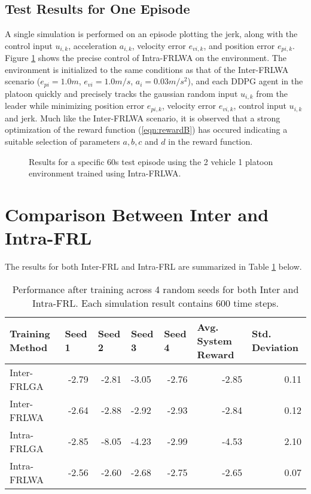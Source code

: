 \subsection{Test Results for One Episode}
A single simulation is performed on an episode plotting the jerk, along with the control
input $u_{i,k}$, acceleration $a_{i,k}$, velocity error $e_{vi,k}$, and position
error $e_{pi,k}$.  Figure \ref{fig:intraFRL-simresult} shows the precise control of
Intra-FRLWA on the environment.  The environment is initialized to the same conditions
as that of the Inter-FRLWA scenario
($e_{pi} = 1.0 m$, $e_{vi}=1.0 m/s$, $a_i = 0.03 m/s^2$), and each DDPG agent in the
platoon quickly and precisely tracks the gaussian random input $u_{i,k}$ from the
leader while minimizing position error $e_{pi,k}$, velocity error $e_{vi,k}$, control input $u_{i,k}$ and jerk.  Much
like the Inter-FRLWA scenario, it is observed that a strong optimization of the reward
function (\ref{eqn:rewardB}) has occured indicating a suitable selection of parameters $a,b,c$ and $d$ in the
reward function.

\begin{figure}[H]
    \centering
    
    \caption{Results for a specific 60s test episode using the 2 vehicle 1 platoon
    environment trained using Intra-FRLWA.}
    \label{fig:intraFRL-simresult}
\end{figure}

\section{Comparison Between Inter and Intra-FRL}
The results for both Inter-FRL and Intra-FRL are summarized in Table \ref{tab:inter_vs_intra} below.

\begin{table}[H]
    \centering
    \scriptsize
    \caption{Performance after training across 4 random seeds for both Inter and Intra-FRL. Each simulation result contains 600 time steps.}
    \begin{tabular}{lrrlrrr} \toprule
    \textbf{Training Method} & \multicolumn{1}{l}{\textbf{Seed 1}} & \multicolumn{1}{l}{\textbf{Seed 2}} & \multicolumn{1}{l}{\textbf{Seed 3}} & \multicolumn{1}{l}{\textbf{Seed 4}} & \multicolumn{1}{l}{\textbf{Avg. System Reward}} & \multicolumn{1}{l}{\textbf{Std. Deviation}} \\ \midrule
        Inter-FRLGA & -2.79 & -2.81 & -3.05 & -2.76 & -2.85 & 0.11 \\
        Inter-FRLWA & -2.64 & -2.88 & -2.92 & -2.93 & -2.84 & 0.12 \\
        Intra-FRLGA & -2.85 & -8.05 & -4.23 & -2.99 & -4.53 & 2.10 \\
        Intra-FRLWA & -2.56 & -2.60 & -2.68 & -2.75 & -2.65 & 0.07 \\ \bottomrule
    \end{tabular}
    \label{tab:inter_vs_intra}
\end{table}


